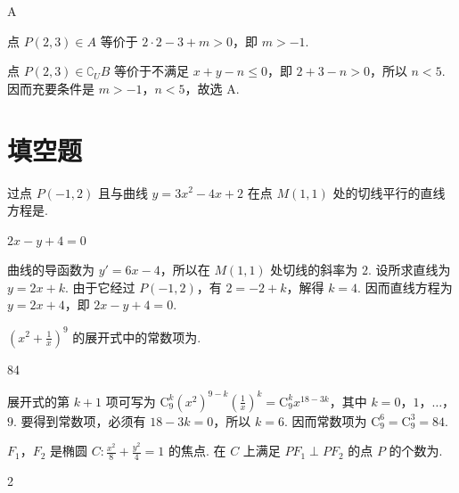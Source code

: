 \begin{answer}
A
\end{answer}

\begin{solution}
点 \(P(2,3)\in A\) 等价于
\(2\cdot2-3+m>0\)，即 \(m>-1\).

点 \(P(2,3)\in\complement_U B\) 等价于不满足 \(x+y-n\leqslant0\)，即
\(2+3-n>0\)，所以 \(n<5\). 因而充要条件是 \(m>-1\)，\(n<5\)，故选 A.
\end{solution}

\section{填空题}
\begin{problem}
过点 \(P(-1,2)\) 且与曲线 \(y = 3x^{2} - 4x + 2\) 在点 \(M(1,1)\) 处的切线平行的直线方程是\fillinblank{}.
\end{problem}

\begin{answer}
\(2x-y+4=0\)
\end{answer}

\begin{solution}
曲线的导函数为 \(y'=6x-4\)，所以在 \(M(1,1)\) 处切线的斜率为 \(2\). 设所求直线为 \(y=2x+k\). 由于它经过 \(P(-1,2)\)，有 \(2=-2+k\)，解得 \(k=4\). 因而直线方程为 \(y=2x+4\)，即 \(2x-y+4=0\).
\end{solution}

\begin{problem}
\(\left(x^{2} + \frac{1}{x}\right)^{9}\) 的展开式中的常数项为\fillinblank{}.
\end{problem}

\begin{answer}
84
\end{answer}

\begin{solution}
展开式的第 \(k+1\) 项可写为
\(\mathrm C_9^k(x^2)^{9-k}\left(\frac{1}{x}\right)^k=\mathrm C_9^k x^{18-3k}\)，其中 \(k=0\)，\(1\)，\(\ldots\)，\(9\). 要得到常数项，必须有 \(18-3k=0\)，所以 \(k=6\). 因而常数项为 \(\mathrm C_9^6=\mathrm C_9^3=84\).
\end{solution}

\begin{problem}
\(F_{1}\)，\(F_{2}\) 是椭圆 \(C: \frac{x^{2}}{8} + \frac{y^{2}}{4} = 1\) 的焦点. 在 \(C\) 上满足 \(PF_{1} \perp PF_{2}\) 的点 \(P\) 的个数为\fillinblank{}.
\end{problem}

\begin{answer}
2
\end{answer}

